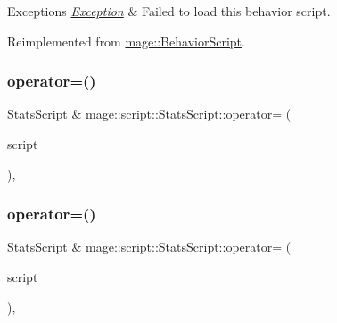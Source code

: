 \begin{DoxyExceptions}{Exceptions}
{\em \hyperlink{classmage_1_1_exception}{Exception}} & Failed to load this behavior script. \\
\hline
\end{DoxyExceptions}


Reimplemented from \hyperlink{classmage_1_1_behavior_script_ae7864876b2ffb1d1d8d8a56e3099f1f2}{mage\+::\+Behavior\+Script}.

\hypertarget{classmage_1_1script_1_1_stats_script_a538428ec1763e0fb4b41839e7943ca56}{}\label{classmage_1_1script_1_1_stats_script_a538428ec1763e0fb4b41839e7943ca56} 
\subsubsection{\texorpdfstring{operator=()}{operator=()}\hspace{0.1cm}{\footnotesize\ttfamily [1/2]}}
{\footnotesize\ttfamily \hyperlink{classmage_1_1script_1_1_stats_script}{Stats\+Script} \& mage\+::script\+::\+Stats\+Script\+::operator= (\begin{DoxyParamCaption}\item[{const \hyperlink{classmage_1_1script_1_1_stats_script}{Stats\+Script} \&}]{script }\end{DoxyParamCaption})\hspace{0.3cm}{\ttfamily [default]}, {\ttfamily [noexcept]}}

\hypertarget{classmage_1_1script_1_1_stats_script_ae99dbfbff061fcc916c968d670a1e481}{}\label{classmage_1_1script_1_1_stats_script_ae99dbfbff061fcc916c968d670a1e481} 
\subsubsection{\texorpdfstring{operator=()}{operator=()}\hspace{0.1cm}{\footnotesize\ttfamily [2/2]}}
{\footnotesize\ttfamily \hyperlink{classmage_1_1script_1_1_stats_script}{Stats\+Script} \& mage\+::script\+::\+Stats\+Script\+::operator= (\begin{DoxyParamCaption}\item[{\hyperlink{classmage_1_1script_1_1_stats_script}{Stats\+Script} \&\&}]{script }\end{DoxyParamCaption})\hspace{0.3cm}{\ttfamily [default]}, {\ttfamily [noexcept]}}

